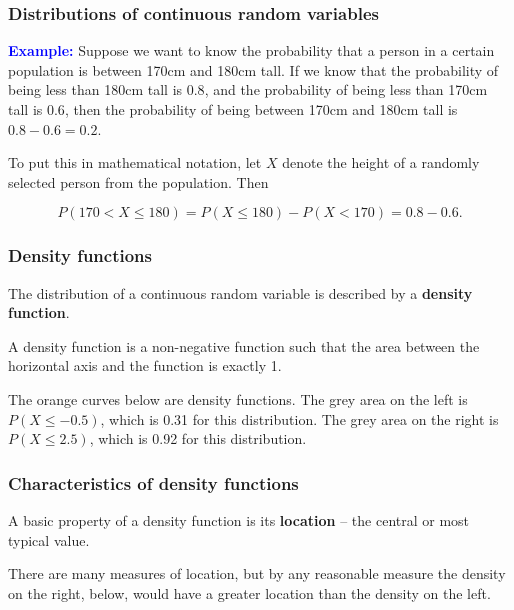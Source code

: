 \begin{frame}
\frametitle{Distributions of continuous random variables}

\textcolor{blue}{\bf Example:} Suppose we want to know the probability
that a person in a certain population is between 170cm and 180cm tall.
If we know that the probability of being less than 180cm tall is
$0.8$, and the probability of being less than 170cm tall is $0.6$,
then the probability of being between 170cm and 180cm tall is
$0.8-0.6=0.2$.

To put this in mathematical notation, let $X$ denote the height of a
randomly selected person from the population.  Then 

$$ P(170<X\le 180) = P(X\le 180) - P(X<170) = 0.8-0.6.
$$

\end{frame}

\begin{frame}
\frametitle{Density functions}

The distribution of a continuous random variable is described by a
{\bf density function}.  

A density function is a non-negative function such that the area
between the horizontal axis and the function is exactly 1.

The orange curves below are density functions.  The grey area on the
left is $P(X \le -0.5)$, which is 0.31 for this distribution.  The
grey area on the right is $P(X \le 2.5)$, which is 0.92 for this
distribution.



\end{frame}

\begin{frame}
\frametitle{Characteristics of density functions}

A basic property of a density function is its {\bf location} -- the
central or most typical value.  

There are many measures of location, but by any reasonable measure the
density on the right, below, would have a greater location than the
density on the left.


\end{frame}

